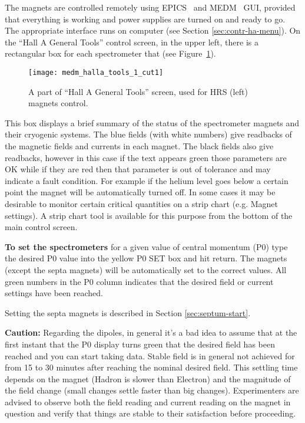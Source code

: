 { The magnets are controlled remotely using EPICS~\cite{EPICSwww} and
 MEDM~\cite{MEDMwww} GUI, provided that everything is working and power 
 supplies are turned on and ready to go.
 The appropriate interface runs
 on computer  (see Section \ref{sec:contr-ha-menu}).
 On the ``Hall A General Tools'' control screen, in the upper left, there is 
 a rectangular box for each spectrometer that (see Figure~\ref{fig:hrs_mag_cntrl}). 
\begin{figure}
\begin{center}
\texttt{[image: medm\_halla\_tools\_1\_cut1]}
{\linespread{1.}
\caption[HRS: Magnets control]{A part of ``Hall A General Tools'' screen, 
        used for HRS (left) magnets control.}
\label{fig:hrs_mag_cntrl}}
\end{center}
\end{figure}

This box displays a brief summary of the status of the spectrometer
magnets and their cryogenic systems. The blue fields (with white
numbers) give readbacks of the magnetic fields and currents in each
magnet. The black fields also give readbacks, however in this case if
the text appears green those parameters are OK while if they are red
then that parameter is out of tolerance and may indicate a fault
condition. For example if the helium level goes below a certain point
the magnet will be automatically turned off.  In some cases it may be
desirable to monitor certain critical quantities on a strip chart
(e.g. Magnet settings). A strip chart tool is available for this
purpose from the bottom of the main control screen.

{\bf To set the spectrometers} for a given value of central momentum
(P0) type the desired P0 value into the yellow P0 SET box and hit
return. The magnets (except the septa magnets) will be automatically 
set to the correct
values. All green numbers in the P0 column indicates that the desired
field or current settings have been reached. 

Setting the septa magnets is described in Section \ref{sec:septum-start}. 

{\bf Caution:} Regarding the
dipoles, in general it's a bad idea to assume that at the first
instant that the P0 display turns green that the desired field has
been reached and you can start taking data. Stable field is in general
not achieved for from 15 to 30 minutes after reaching the nominal
desired field. This settling time depends on the magnet (Hadron is
slower than Electron) and the magnitude of the field change (small
changes settle faster than big changes). Experimenters are advised to
observe both the field reading and current reading on the magnet in
question and verify that things are stable to their satisfaction
before proceeding.
 
}
